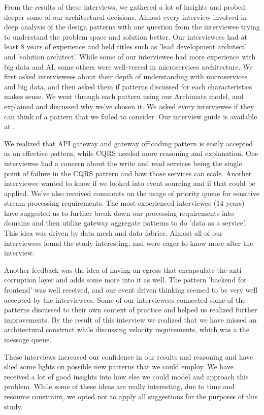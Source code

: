 \documentclass[conference]{IEEEtran}
\begin{document}
From the results of these interviews, we gathered a lot of insights and probed deeper some of our architectural decisions. Almost every interview involved in deep analysis of the design patterns with one question from the interviewee trying to understand the problem space and solution better. Our interviewees had at least 8 years of experience and held titles such as 'lead development architect' and 'solution architect'. While some of our interviewee had more experience with big data and AI, some others were well-versed in microservices architecture. We first asked interviewees about their depth of understanding with microservices and big data, and then asked them if patterns discussed for each characteristics makes sense. We went through each pattern using our Archimate model, and explained and discussed why we've chosen it. We asked every interviewee if they can think of a pattern that we failed to consider. Our interview guide is available at \cite{interviewGuide}.

We realized that API gateway and gateway offloading pattern is easily accepted as an effective pattern, while CQRS needed more reasoning and explanation. One interviewee had a concern about the write and read services being the single point of failure in the CQRS pattern and how those services can scale. Another interviewee wanted to know if we looked into event sourcing and if that could be applied. We've also received comments on the usage of priority queue for sensitive stream processing requirements. The most experienced interviewee (14 years) have suggested us to further break down our processing requirements into domains and then utilize gateway aggregate patterns to do 'data as a service'. This idea was driven by data mesh and data fabrics. Almost all of our interviewees found the study interesting, and were eager to know more after the interview. 

Another feedback was the idea of having an egress that encapsulate the anti-corruption layer and adds some more into it as well. The pattern 'backend for frontend' was well received, and our event driven thinking seemed to be very well accepted by the interviewees. Some of our interviewees connected some of the patterns discussed to their own context of practice and helped us realized further improvements. By the result of this interview we realized that we have missed an architectural construct while discussing velocity requirements, which was a the message queue. 

These interviews increased our confidence in our results and reasoning and have shed some lights on possible new patterns that we could employ. We have received a lot of good insights into how else we could model and approach this problem. While some of these ideas are really interesting, due to time and resource constraint, we opted not to apply all suggestions for the purposes of this study.
\end{document}
